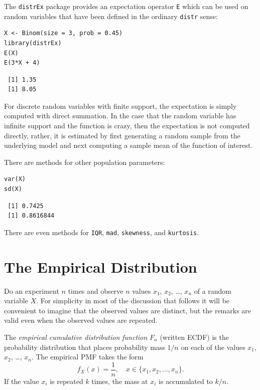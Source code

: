 \documentclass[captions=tableheading]{scrbook}
\begin{document}
The \texttt{distrEx} package provides an expectation operator \texttt{E} which can be used on random variables that have been defined in the ordinary \texttt{distr} sense:


\lstset{language=R}
\begin{lstlisting}
X <- Binom(size = 3, prob = 0.45)
library(distrEx)
E(X)
E(3*X + 4)
\end{lstlisting}

\begin{verbatim}
 [1] 1.35
 [1] 8.05
\end{verbatim}

For discrete random variables with finite support, the expectation is simply computed with direct summation. In the case that the random variable has infinite support and the function is crazy, then the expectation is not computed directly, rather, it is estimated by first generating a random sample from the underlying model and next computing a sample mean of the function of interest. 

There are methods for other population parameters:


\lstset{language=R}
\begin{lstlisting}
var(X)
sd(X)
\end{lstlisting}

\begin{verbatim}
 [1] 0.7425
 [1] 0.8616844
\end{verbatim}

There are even methods for \texttt{IQR}, \texttt{mad}, \texttt{skewness}, and \texttt{kurtosis}.
\section{The Empirical Distribution}
\label{sec-5-5}
\label{sec-empirical-distribution}


Do an experiment \(n\) times and observe \(n\) values \(x_{1}\), \(x_{2}\), \ldots{}, \(x_{n}\) of a random variable \(X\). For simplicity in most of the discussion that follows it will be convenient to imagine that the observed values are distinct, but the remarks are valid even when the observed values are repeated. 

\begin{defn}
The \emph{empirical cumulative distribution function} \(F_{n}\) (written ECDF) is the probability distribution that places probability mass \(1/n\) on each of the values \(x_{1}\), \(x_{2}\), \ldots{}, \(x_{n}\). The empirical PMF takes the form
\begin{equation} 
f_{X}(x)=\frac{1}{n},\quad x\in \{ x_{1},x_{2},...,x_{n} \}.
\end{equation}
If the value \(x_{i}\) is repeated \(k\) times, the mass at \(x_{i}\) is accumulated to \(k/n\).
\end{defn}
\end{document}
